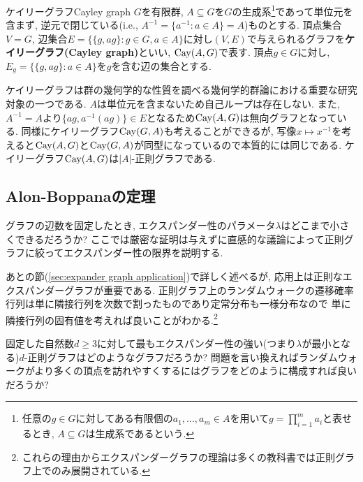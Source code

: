 %
\begin{definition}{ケイリーグラフ}{Cayley graph}
    $G$を有限群, $A\subseteq G$を$G$の生成系\footnote{任意の$g\in G$に対してある有限個の$a_1,\dots,a_m\in A$を用いて$g=\prod_{i=1}^ma_i$と表せるとき, $A\subseteq G$は生成系であるという.}であって単位元を含まず, 逆元で閉じている(i.e., $A^{-1}=\{a^{-1}\colon a\in A\}=A$)ものとする.
    頂点集合$V=G$, 辺集合$E=\{\{g,ag\}\colon g\in G,a\in A\}$に対し$(V,E)$で与えられるグラフを\textbf{ケイリーグラフ(Cayley graph)}といい, $\mathrm{Cay}(A,G)$で表す.
    頂点$g\in G$に対し, $E_g=\{\{g,ag\}\colon a\in A\}$を$g$を含む辺の集合とする.
\end{definition}
%
ケイリーグラフは群の幾何学的な性質を調べる幾何学的群論における重要な研究対象の一つである.
$A$は単位元を含まないため自己ループは存在しない.
また, $A^{-1}=A$より$\{ag,a^{-1}(ag)\}\in E$となるため$\mathrm{Cay}(A,G)$は無向グラフとなっている.
同様にケイリーグラフ$\mathrm{Cay}(G,A)$も考えることができるが, 写像$x\mapsto x^{-1}$を考えると$\mathrm{Cay}(A,G)$と$\mathrm{Cay}(G,A)$が同型になっているので本質的には同じである.
ケイリーグラフ$\mathrm{Cay}(A,G)$は$|A|$-正則グラフである.


\subsection{Alon-Boppanaの定理}
グラフの辺数を固定したとき, エクスパンダー性のパラメータ$\lambda$はどこまで小さくできるだろうか?
ここでは厳密な証明は与えずに直感的な議論によって正則グラフに絞ってエクスパンダー性の限界を説明する.

あとの節(\cref{sec:expander graph application})で詳しく述べるが,
応用上は正則なエクスパンダーグラフが重要である.
正則グラフ上のランダムウォークの遷移確率行列は単に隣接行列を次数で割ったものであり定常分布も一様分布なので
単に隣接行列の固有値を考えれば良いことがわかる.\footnote{これらの理由からエクスパンダーグラフの理論は多くの教科書では正則グラフ上でのみ展開されている.}

固定した自然数$d\ge 3$に対して最もエクスパンダー性の強い(つまり$\lambda$が最小となる)$d$-正則グラフはどのようなグラフだろうか?
問題を言い換えればランダムウォークがより多くの頂点を訪れやすくするにはグラフをどのように構成すれば良いだろうか?

